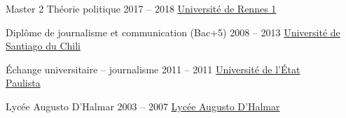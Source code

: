 \begin{yearlist}

\item[Master 2 Théorie politique]{2017 -- 2018}
     {\href{https://formations.univ-rennes1.fr/formations/master-2-theorie-politique}{Université de Rennes 1}}
		 {}
     

		 {}


\item[Diplôme de journalisme et communication (Bac+5)]{2008 -- 2013}
     {\href{http://periodismo.usach.cl/} {Université de Santiago du Chili}}
		 {}


\item[Échange universitaire -- journalisme]{2011 -- 2011}
     {\href{http://www.unesp.br/} {Université de l'État \\ Paulista}}
		 {}

\item[Lycée Augusto D'Halmar]{2003 -- 2007}
     {\href{www.liceoaugustodhalmar.cl/liceo}{Lycée Augusto D'Halmar}}
		 {}		 
		 
		 
		 

\end{yearlist}





%
%



